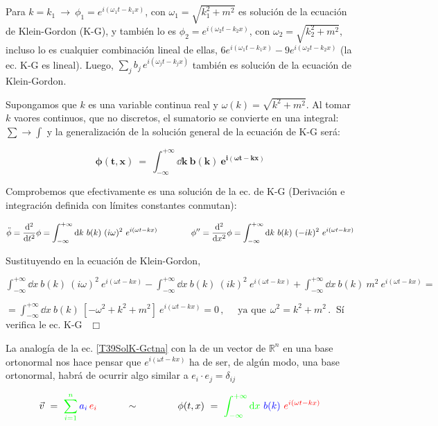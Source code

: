 Para $k=k_1 \ \to \ \phi_1=e^{i(\omega_1t-k_1x)}$, con $\omega_1=\sqrt{k_1^2+m^2}$ es solución de la ecuación de Klein-Gordon (K-G), y también lo es $\phi_2=e^{i(\omega_2t-k_2x)}$, con $\omega_2=\sqrt{k_2^2+m^2}$, incluso lo es cualquier combinación lineal de ellas, $6e^{i(\omega_1t-k_1x)}-9e^{i(\omega_2t-k_2x)}$ (la ec. K-G es lineal). Luego, $\sum_j b_j\, e^{i(\omega_jt-k_jx)}$ también es solución de la ecuación de Klein-Gordon.

Supongamos que $k$ es una variable continua real y $\omega(k)=\sqrt{k^2+m^2}$. Al tomar $k$ vaores continuos, que no discretos, el sumatorio se convierte en una integral: $\sum \to \int$ y la generalización de la solución general de la ecuación de K-G será:

\begin{equation}
\label{T39SolK-Gctna}
\boldsymbol{
\phi(t,x) \ = \ \int_{-\infty}^{+\infty} \dd k \ b(k)\ e^{i(\omega t-kx)}
}	
\end{equation}

Comprobemos que efectivamente  es una solución de la ec. de K-G \textcolor{gris}{(Derivación e integración definida con límites constantes conmutan)}:

$\displaystyle \ddot \phi=\dv[2]{t} \phi = \int_{-\infty}^{+\infty} \dd k \ b(k) \ (i\omega)^2\ e^{i(\omega t-kx)} \qquad  \qquad \phi''=\dv[2]{x} \phi = \int_{-\infty}^{+\infty} \dd k \ b(k) \ (-ik)^2\ e^{i(\omega t-kx)}$

Sustituyendo en la ecuación de Klein-Gordon,

$\displaystyle 
\int_{-\infty}^{+\infty} \dd x \ b(k)\ (i\omega)^2\ e^{i(\omega t-kx)} -\int_{-\infty}^{+\infty} \dd x \ b(k)\ (ik)^2\ e^{i(\omega t-kx)} + \int_{-\infty}^{+\infty} \dd x \ b(k)\ m^2\  e^{i(\omega t-kx)}= $

$\displaystyle = \int_{-\infty}^{+\infty} \dd x \ b(k)\ [-\omega^2+k^2+m^2]\  e^{i(\omega t-kx)} = 0\, ,  \quad \text{ ya que} \ \ \omega^2=k^2+m^2\, . \ $ Sí verifica le ec. K-G  $ \ \ \Box$


La analogía de la ec. \ref{T39SolK-Gctna} con la de un vector de $\mathbb R^n$ en una base ortonormal nos hace pensar que $e^{i(\omega t-kx)}$ ha de ser, de algún modo, una base ortonormal, habrá de ocurrir algo similar a $e_i \cdot e_j=\delta_{ij}$


$$\displaystyle \vec v \ = \ \textcolor{green}{\sum_{i=1}^n}\,\textcolor{blue}{ a_i}\, \textcolor{red}{e_i} \qquad \quad \sim  \qquad \qquad \phi(t,x) \ = \ \textcolor{green}{\int_{-\infty}^{+\infty} \dd x} \ \textcolor{blue}{b(k)}\ \textcolor{red}{e^{i(\omega t-kx)}}$$

